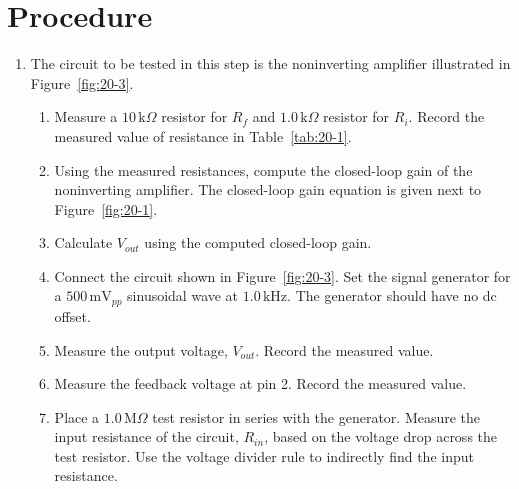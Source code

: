 \documentclass[11pt]{article}
\begin{document}
\newpage
\section*{Procedure}

\begin{enumerate}[label=\arabic*.]
    \item The circuit to be tested in this step is the noninverting amplifier illustrated in Figure~\ref{fig:20-3}.
    \begin{enumerate}[label=\alph*.]
        \item Measure a $10\,\text{k}\Omega$ resistor for $R_f$ and $1.0\,\text{k}\Omega$ resistor for $R_i$. Record the measured value of resistance in Table~\ref{tab:20-1}.
        \item Using the measured resistances, compute the closed-loop gain of the noninverting amplifier. The closed-loop gain equation is given next to Figure~\ref{fig:20-1}.
        \item Calculate $V_{out}$ using the computed closed-loop gain.
        \item Connect the circuit shown in Figure~\ref{fig:20-3}. Set the signal generator for a $500\,\text{mV}_{pp}$ sinusoidal wave at $1.0\,\text{kHz}$. The generator should have no dc offset.
        \item Measure the output voltage, $V_{out}$. Record the measured value.
        \item Measure the feedback voltage at pin 2. Record the measured value.
        \item Place a $1.0\,\text{M}\Omega$ test resistor in series with the generator. Measure the input resistance of the circuit, $R_{in}$, based on the voltage drop across the test resistor. Use the voltage divider rule to indirectly find the input resistance.
    \end{enumerate}
\end{enumerate}

\begin{table}[h!]
\centering
\caption{Noninverting amplifier measurements}
\label{tab:20-1}
\end{table}
\end{document}

